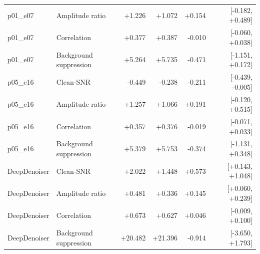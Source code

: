 \begin{tabular}{llrrrr}
p01_e07 & Amplitude ratio & +1.226 & +1.072 & +0.154 & [-0.182, +0.489] \\
p01_e07 & Correlation & +0.377 & +0.387 & -0.010 & [-0.060, +0.038] \\
p01_e07 & Background suppression & +5.264 & +5.735 & -0.471 & [-1.151, +0.172] \\
p05_e16 & Clean-SNR & -0.449 & -0.238 & -0.211 & [-0.439, -0.005] \\
p05_e16 & Amplitude ratio & +1.257 & +1.066 & +0.191 & [-0.120, +0.515] \\
p05_e16 & Correlation & +0.357 & +0.376 & -0.019 & [-0.071, +0.033] \\
p05_e16 & Background suppression & +5.379 & +5.753 & -0.374 & [-1.131, +0.348] \\
DeepDenoiser & Clean-SNR & +2.022 & +1.448 & +0.573 & [+0.143, +1.048] \\
DeepDenoiser & Amplitude ratio & +0.481 & +0.336 & +0.145 & [+0.060, +0.239] \\
DeepDenoiser & Correlation & +0.673 & +0.627 & +0.046 & [-0.009, +0.100] \\
DeepDenoiser & Background suppression & +20.482 & +21.396 & -0.914 & [-3.650, +1.793] \\
\bottomrule
\end{tabular}
